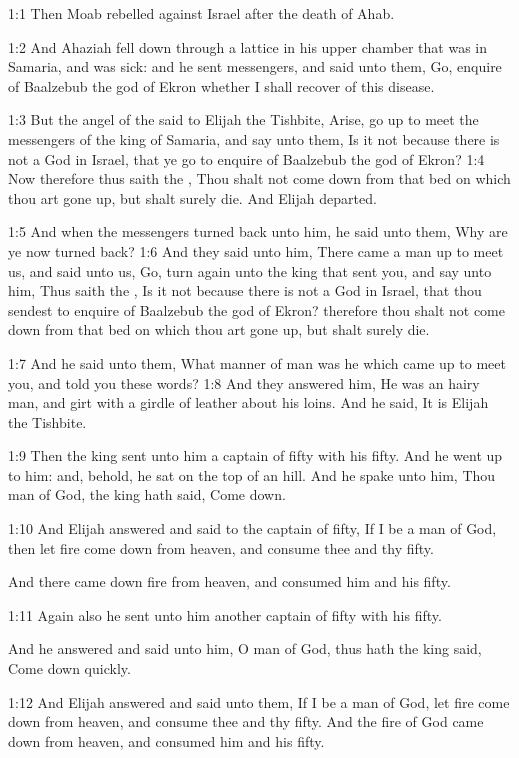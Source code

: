 
1:1 Then Moab rebelled against Israel after the death of Ahab.

1:2 And Ahaziah fell down through a lattice in his upper chamber that
was in Samaria, and was sick: and he sent messengers, and said unto
them, Go, enquire of Baalzebub the god of Ekron whether I shall
recover of this disease.

1:3 But the angel of the \LORD said to Elijah the Tishbite, Arise, go
up to meet the messengers of the king of Samaria, and say unto them,
Is it not because there is not a God in Israel, that ye go to enquire
of Baalzebub the god of Ekron?  1:4 Now therefore thus saith the \LORD,
Thou shalt not come down from that bed on which thou art gone up, but
shalt surely die. And Elijah departed.

1:5 And when the messengers turned back unto him, he said unto them,
Why are ye now turned back?  1:6 And they said unto him, There came a
man up to meet us, and said unto us, Go, turn again unto the king that
sent you, and say unto him, Thus saith the \LORD, Is it not because
there is not a God in Israel, that thou sendest to enquire of
Baalzebub the god of Ekron? therefore thou shalt not come down from
that bed on which thou art gone up, but shalt surely die.

1:7 And he said unto them, What manner of man was he which came up to
meet you, and told you these words?  1:8 And they answered him, He was
an hairy man, and girt with a girdle of leather about his loins. And
he said, It is Elijah the Tishbite.

1:9 Then the king sent unto him a captain of fifty with his fifty. And
he went up to him: and, behold, he sat on the top of an hill. And he
spake unto him, Thou man of God, the king hath said, Come down.

1:10 And Elijah answered and said to the captain of fifty, If I be a
man of God, then let fire come down from heaven, and consume thee and
thy fifty.

And there came down fire from heaven, and consumed him and his fifty.

1:11 Again also he sent unto him another captain of fifty with his
fifty.

And he answered and said unto him, O man of God, thus hath the king
said, Come down quickly.

1:12 And Elijah answered and said unto them, If I be a man of God, let
fire come down from heaven, and consume thee and thy fifty. And the
fire of God came down from heaven, and consumed him and his fifty.

